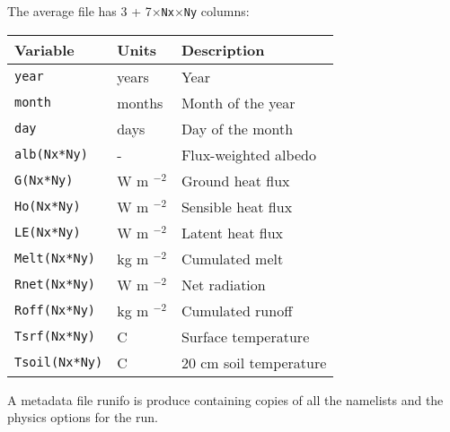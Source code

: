 \documentclass{article}
\begin{document}
The average file has 3 + 7$\times${\tt Nx$\times$Ny} columns:

\begin{tabular}{|l|l|l|}
\hline
Variable           & Units        & Description            \\
\hline
{\tt year}         & years        & Year                   \\
{\tt month}        & months       & Month of the year      \\
{\tt day}          & days         & Day of the month       \\
{\tt alb(Nx*Ny)}   & -            & Flux-weighted albedo   \\
{\tt G(Nx*Ny)}     & W m $^{-2}$  & Ground heat flux       \\
{\tt Ho(Nx*Ny)}    & W m $^{-2}$  & Sensible heat flux     \\
{\tt LE(Nx*Ny)}    & W m $^{-2}$  & Latent heat flux       \\
{\tt Melt(Nx*Ny)}  & kg m $^{-2}$ & Cumulated melt         \\
{\tt Rnet(Nx*Ny)}  & W m $^{-2}$  & Net radiation          \\
{\tt Roff(Nx*Ny)}  & kg m $^{-2}$ & Cumulated runoff       \\
{\tt Tsrf(Nx*Ny)}  & C            & Surface temperature    \\
{\tt Tsoil(Nx*Ny)} & C            & 20 cm soil temperature \\
\hline 
\end{tabular}

A metadata file runifo is produce containing copies of all the namelists and the physics options for the run.
 



\end{document}
